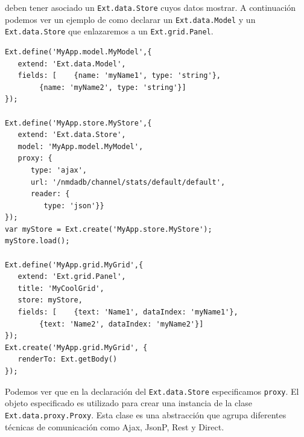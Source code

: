 	deben tener asociado un \texttt{Ext.data.Store} cuyos datos mostrar. A continuación podemos ver un ejemplo de como declarar un
	\texttt{Ext.data.Model} y un \texttt{Ext.data.Store} que enlazaremos a un \texttt{Ext.grid.Panel}.
	\begin{lstlisting}[style=myJs]
Ext.define('MyApp.model.MyModel',{
   extend: 'Ext.data.Model',
   fields: [	{name: 'myName1', type: 'string'},
   		{name: 'myName2', type: 'string'}]
});

Ext.define('MyApp.store.MyStore',{
   extend: 'Ext.data.Store',
   model: 'MyApp.model.MyModel',
   proxy: {
      type: 'ajax',
      url: '/nmdadb/channel/stats/default/default',
      reader: {
         type: 'json'}}
});
var myStore = Ext.create('MyApp.store.MyStore');
myStore.load();

Ext.define('MyApp.grid.MyGrid',{
   extend: 'Ext.grid.Panel',
   title: 'MyCoolGrid',
   store: myStore,
   fields: [	{text: 'Name1', dataIndex: 'myName1'},
		{text: 'Name2', dataIndex: 'myName2'}]
});
Ext.create('MyApp.grid.MyGrid', {
   renderTo: Ext.getBody()
});
	\end{lstlisting}
	\par
	Podemos ver que en la declaración del \texttt{Ext.data.Store} especificamos \texttt{proxy}. El objeto especificado es utilizado para crear una
	instancia de la clase \texttt{Ext.data.proxy.Proxy}. Esta clase es una abstracción que agrupa diferentes técnicas de comunicación como Ajax,
	JsonP, Rest y Direct.


